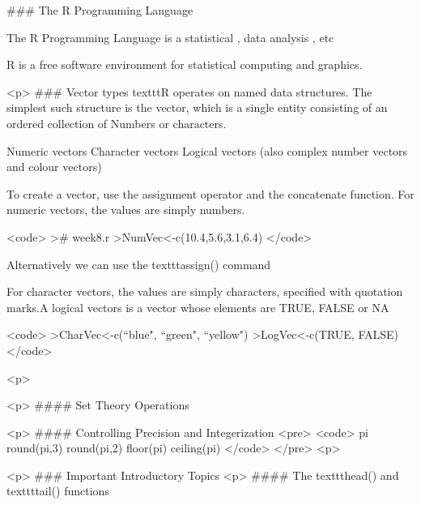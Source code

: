 
### {The R Programming Language}

The R Programming Language is a statistical , data analysis , etc

R is a free software environment for statistical computing and graphics.



<p>
### {Vector types}
texttt{R} operates on named data structures. The simplest such structure is the
vector, which is a single entity consisting of an ordered collection of
Numbers or characters.


Numeric vectors
Character vectors
Logical vectors
(also complex number vectors and colour vectors)


To create a vector, use the assignment operator and the concatenate function.
For numeric vectors, the values are simply numbers.

<code>
># week8.r
>NumVec<-c(10.4,5.6,3.1,6.4)
</code>

Alternatively we can use the texttt{assign()} command

For character vectors, the values are simply characters, specified with
quotation marks.A logical vectors is a vector whose elements are TRUE, FALSE or NA

<code>
>CharVec<-c(``blue", ``green", ``yellow")
>LogVec<-c(TRUE, FALSE)
</code>

<p>







<p>
#### {Set Theory Operations}

<p>
#### {Controlling Precision and Integerization}
<pre>
<code>
pi
round(pi,3)
round(pi,2)
floor(pi)
ceiling(pi)
</code>
</pre>
<p>


<p>
### {Important Introductory Topics}
<p>
#### {The texttt{head()} and texttt{tail()} functions}
